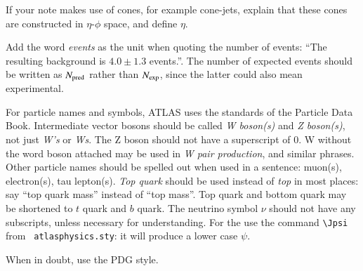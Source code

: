 \documentclass[coverpage]{style/atlasdoc}
\begin{document}
If your note makes use of cones, for example cone-jets, explain that
these cones are constructed in $\eta$-$\phi$ space, and define $\eta$.

Add the word \emph{events} as the unit when quoting the number of
events: ``The resulting background is $4.0 \pm 1.3$ events.''.  The
number of expected events should be written as $N_{\rm pred}$ rather
than $N_{\rm exp}$, since the latter could also mean experimental.

For particle names and symbols, ATLAS uses the standards of the
Particle Data Book. Intermediate vector bosons should be called
\emph{W boson(s)} and \emph{Z boson(s)}, not just \emph{W's} or
\emph{Ws}. The Z boson should not have a superscript of 0. W without
the word boson attached may be used in \emph{W pair production}, and
similar phrases.  Other particle names should be spelled out when used
in a sentence: muon(s), electron(s), tau lepton(s). \emph{Top quark}
should be used instead of \emph{top} in most places: say ``top quark
mass'' instead of ``top mass''.  Top quark and bottom quark may be
shortened to $t$ quark and $b$ quark. The neutrino
symbol $\nu$ should not have any subscripts, unless necessary for
understanding. For the \Jpsi{} use the command \verb+\Jpsi+ from {\tt
atlasphysics.sty}: it will produce a lower case $\psi$.

When in doubt, use the PDG style.
\end{document}

